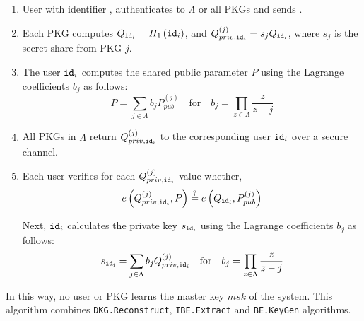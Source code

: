 \begin{algorithm}[H]
\begin{description}
    \begin{enumerate}
        \item User with identifier , authenticates to $\Lambda$ or all PKGs and sends .
        \item Each PKG computes $Q_{\mathtt{id}_{i}} = H_1 \left( \mathtt{id}_{i} \right)$, and $Q_{priv,\mathtt{id}_{i}}^{(j)} = s_j Q_{\mathtt{id}_{i}}$, where $s_j$ is the secret share from PKG $j$.
        \item The user $\mathtt{id}_{i}$ computes the shared public parameter $P$ using the Lagrange coefficients $b_j$ as follows:
        \begin{equation*}
         P = \sum_{j \in \Lambda} b_j P_{pub}^{\left( j \right)} \quad \textrm{for} \quad b_j = \prod_{z \in \Lambda} \frac{z}{z-j}
        \end{equation*}
        \item All PKGs in $\Lambda$ return $Q_{priv,\mathtt{id}_{i}}^{(j)}$ to the corresponding user $\mathtt{id}_{i}$ over a secure channel.
        \item Each user verifies for each $Q_{priv,\mathtt{id}_{i}}^{(j)}$ value whether, 
        \begin{equation*}
            e \left( Q_{priv , \mathtt{id}_{i} }^{(j)}, P \right ) \stackrel{?}{=} e \left( Q_{\mathtt{id}_{i}}, P_{pub}^{(j)} \right)
        \end{equation*}
        
        Next, $\mathtt{id}_{i}$ calculates the private key $s_{\mathtt{id}_{i}}$ using the Lagrange coefficients $b_j$ as follows: 
        \begin{equation*}
            s_{\mathtt{id}_{i}} = \sum\limits_{j\in\Lambda} b_j Q_{priv,\mathtt{id}_{i}}^{(j)} \quad \textrm{for} \quad b_j = \prod_{z\in \Lambda} \frac{z}{z-j}
        \end{equation*}
        \end{enumerate}
        In this way, no user or PKG learns the master key $msk$ of the system. This algorithm combines \texttt{DKG.Reconstruct}, \texttt{IBE.Extract} and \texttt{BE.KeyGen} algorithms.

    \bigskip
    \bigskip
    \bigskip
    \bigskip
    \bigskip
    \bigskip
    \bigskip 
    \bigskip
    \bigskip
    \bigskip
    \bigskip
    \bigskip
    \bigskip
    \bigskip
    \bigskip 
    \bigskip
    \bigskip
    \bigskip
    \bigskip 
\end{description}
\end{algorithm}

